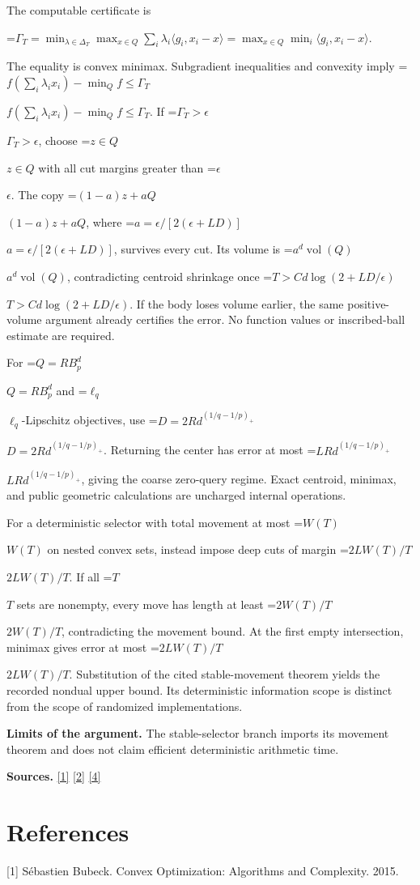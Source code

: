 \documentclass[10pt,a4paper]{article}
\newcommand{\AtlasMath}[1]{\par\begingroup\centering\setbox0=\hbox{$\displaystyle #1$}\ifdim\wd0>1.4\linewidth\typeout{ATLAS WIDE FORMULA: \the\wd0}\fi\ifdim\wd0>\linewidth\resizebox{\linewidth}{!}{\box0}\else\box0\fi\par\endgroup}
\newcommand{\AtlasInlineMath}[1]{\begingroup\setbox0=\hbox{$#1$}\ifdim\wd0>.4\linewidth\endgroup\AtlasMath{#1}\else\endgroup$#1$\fi}
\begin{document}
The computable certificate is

\AtlasMath{\Gamma_T=\min_{\lambda\in\Delta_T}\max_{x\in Q}\sum_i\lambda_i\langle g_i,x_i-x\rangle
=\max_{x\in Q}\min_i\langle g_i,x_i-x\rangle.}

The equality is convex minimax. Subgradient inequalities and convexity imply
\AtlasInlineMath{f(\sum_i\lambda_ix_i)-\min_Qf\le\Gamma_T}.
If \AtlasInlineMath{\Gamma_T>\epsilon}, choose \AtlasInlineMath{z\in Q} with all cut margins greater than \AtlasInlineMath{\epsilon}. The copy \AtlasInlineMath{(1-a)z+aQ}, where \AtlasInlineMath{a=\epsilon/[2(\epsilon+LD)]}, survives every cut. Its volume is \AtlasInlineMath{a^d\operatorname{vol}(Q)}, contradicting centroid shrinkage once \AtlasInlineMath{T>C d\log(2+LD/\epsilon)}. If the body loses volume earlier, the same positive-volume argument already certifies the error. No function values or inscribed-ball estimate are required.

For \AtlasInlineMath{Q=RB_p^d} and \AtlasInlineMath{\ell_q}-Lipschitz objectives, use \AtlasInlineMath{D=2Rd^{(1/q-1/p)_+}}. Returning the center has error at most \AtlasInlineMath{LRd^{(1/q-1/p)_+}}, giving the coarse zero-query regime. Exact centroid, minimax, and public geometric calculations are uncharged internal operations.

For a deterministic selector with total movement at most \AtlasInlineMath{W(T)} on nested convex sets, instead impose deep cuts of margin \AtlasInlineMath{2LW(T)/T}. If all \AtlasInlineMath{T} sets are nonempty, every move has length at least \AtlasInlineMath{2W(T)/T}, contradicting the movement bound. At the first empty intersection, minimax gives error at most \AtlasInlineMath{2LW(T)/T}. Substitution of the cited stable-movement theorem yields the recorded nondual upper bound. Its deterministic information scope is distinct from the scope of randomized implementations.

\textbf{Limits of the argument.} The stable-selector branch imports its movement theorem and does not claim efficient deterministic arithmetic time.

\textbf{Sources.} \href{https://arxiv.org/pdf/1405.4980}{[1]} \href{https://www2.isye.gatech.edu/~nemirovs/MOR_AccuracyCertificates.pdf}{[2]} \href{https://arxiv.org/pdf/2609.20701}{[4]}

\section{References}
[1] Sébastien Bubeck. Convex Optimization: Algorithms and Complexity. 2015.
\end{document}
